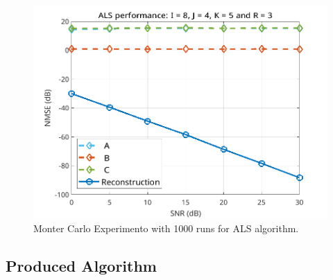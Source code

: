 \documentclass[a4paper,10pt]{article}
\begin{document}
    \begin{figure}[ht!]
        \centering 
        \includegraphics[width=0.60\linewidth]{figs/hw11a2.png} \par 
        \caption{Monter Carlo Experimento with 1000 runs for ALS algorithm.}
        \label{fig:hw11a2} 
    \end{figure}

    \newpage
    \subsection*{Produced Algorithm}
\end{document}
